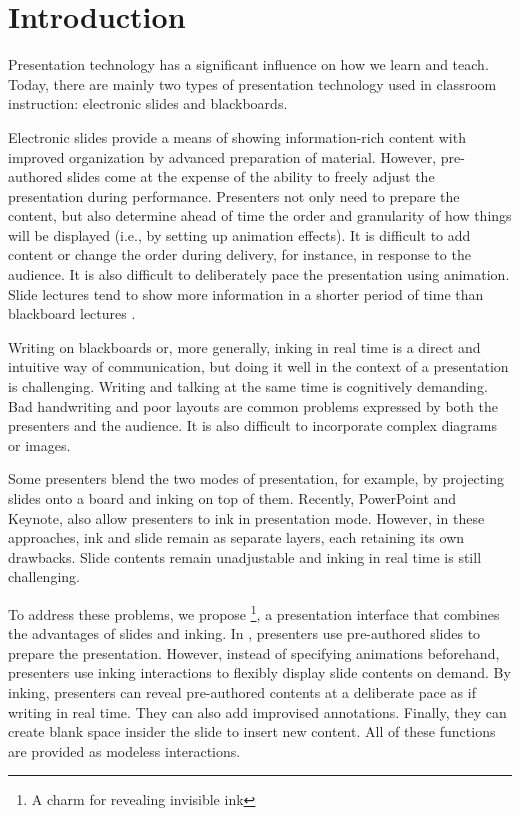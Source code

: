 \section{Introduction}

Presentation technology has a significant influence on how we learn and teach. 
Today, there are mainly two types of presentation technology used in classroom instruction: electronic slides and blackboards. 

Electronic slides provide a means of showing information-rich content with improved organization by advanced preparation of material. However, pre-authored slides come at the expense of the ability to freely adjust the presentation during performance. Presenters not only need to prepare the content, but also determine ahead of time the order and granularity of how things will be displayed (i.e., by setting up animation effects). It is difficult to add content or change the order during delivery, for instance, in response to the audience. It is also difficult to deliberately pace the presentation using animation. Slide lectures tend to show more information in a shorter period of time than blackboard lectures \cite{lanir2008observing}.

Writing on blackboards or, more generally, inking in real time is a direct and intuitive way of communication, but doing it well in the context of a presentation is challenging. Writing and talking at the same time is cognitively demanding. Bad handwriting and poor layouts are common problems expressed by both the presenters and the audience. It is also difficult to incorporate complex diagrams or images.

Some presenters blend the two modes of presentation, for example, by projecting slides onto a board and inking on top of them. Recently, PowerPoint and Keynote, also allow presenters to ink in presentation mode. However, in these approaches, ink and slide remain as separate layers, each retaining its own drawbacks. Slide contents remain unadjustable and inking in real time is still challenging.  

To address these problems, we propose \interface \footnote{A charm for revealing invisible ink\cite{rowling1997harry}}, a presentation interface that combines the advantages of slides and inking.
%
In \interface, presenters use pre-authored slides to prepare the presentation. However, instead of specifying animations beforehand, presenters use inking interactions to flexibly display slide contents on demand. By inking, presenters can reveal pre-authored contents at a deliberate pace as if writing in real time. They can also add improvised annotations. Finally, they can create blank space insider the slide to insert new content. All of these functions are provided as modeless interactions.

